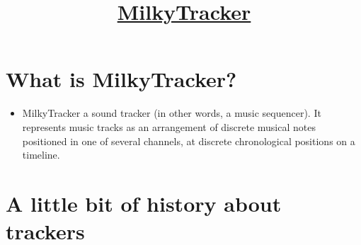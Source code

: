 
\title{\href{http://www.milkytracker.org/}{MilkyTracker}}

\maketitle
\tableofcontents

\section{What is MilkyTracker?}

\begin{itemize}
\item MilkyTracker a sound tracker (in other words, a music
  sequencer). It represents music tracks as an arrangement of discrete
  musical notes positioned in one of several channels, at discrete
  chronological positions on a timeline.
\end{itemize}


\section{A little bit of history about trackers}

